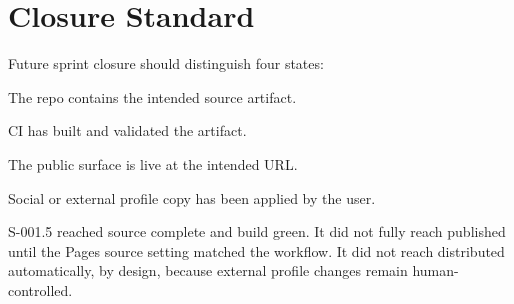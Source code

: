 \documentclass[a4paper,11pt,openany]{report}
\begin{document}
\section{Closure Standard}

Future sprint closure should distinguish four states:

\begin{description}[style=nextline]
  \item[Source complete]
    The repo contains the intended source artifact.
  \item[Build green]
    CI has built and validated the artifact.
  \item[Published]
    The public surface is live at the intended URL.
  \item[Distributed]
    Social or external profile copy has been applied by the user.
\end{description}

S-001.5 reached source complete and build green. It did not fully reach
published until the Pages source setting matched the workflow. It did not reach
distributed automatically, by design, because external profile changes remain
human-controlled.
\end{document}
